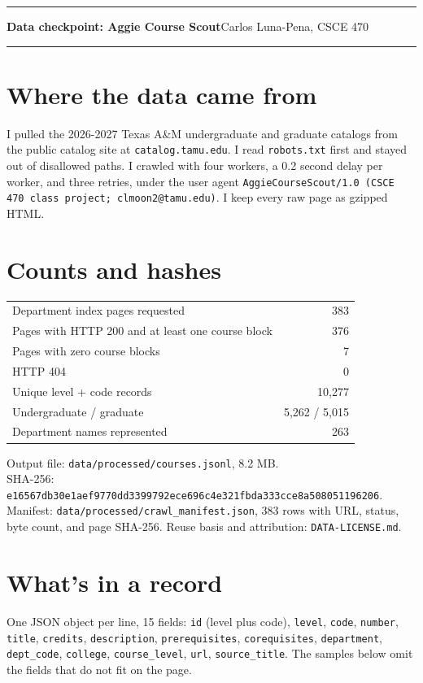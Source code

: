 \documentclass[9.5pt]{article}
\begin{document}
{\color{maroon}\rule{\linewidth}{3pt}}
{\bfseries\large\color{maroon} Data checkpoint: Aggie Course Scout}\hfill Carlos Luna-Pena, CSCE 470
{\color{maroon}\rule{\linewidth}{1pt}}

\section*{Where the data came from}
I pulled the 2026-2027 Texas A\&M undergraduate and graduate catalogs from the public catalog site at \texttt{catalog.tamu.edu}. I read \texttt{robots.txt} first and stayed out of disallowed paths. I crawled with four workers, a 0.2 second delay per worker, and three retries, under the user agent \texttt{AggieCourseScout/1.0 (CSCE 470 class project; clmoon2@tamu.edu)}. I keep every raw page as gzipped HTML.

\section*{Counts and hashes}
\begin{tabular}{@{}lr@{}}
\toprule
Department index pages requested & 383\\
Pages with HTTP 200 and at least one course block & 376\\
Pages with zero course blocks & 7\\
HTTP 404 & 0\\
Unique level + code records & 10,277\\
Undergraduate / graduate & 5,262 / 5,015\\
Department names represented & 263\\
\bottomrule
\end{tabular}

\smallskip
Output file: \texttt{data/processed/courses.jsonl}, 8.2 MB.\\
SHA-256: \texttt{e16567db30e1aef9770dd3399792ece696c4e321fbda333cce8a508051196206}.\\
Manifest: \texttt{data/processed/crawl\_manifest.json}, 383 rows with URL, status, byte count, and page SHA-256. Reuse basis and attribution: \texttt{DATA-LICENSE.md}.

\section*{What's in a record}
One JSON object per line, 15 fields: \texttt{id} (level plus code), \texttt{level}, \texttt{code}, \texttt{number}, \texttt{title}, \texttt{credits}, \texttt{description}, \texttt{prerequisites}, \texttt{corequisites}, \texttt{department}, \texttt{dept\_code}, \texttt{college}, \texttt{course\_level}, \texttt{url}, \texttt{source\_title}. The samples below omit the fields that do not fit on the page.
\end{document}
